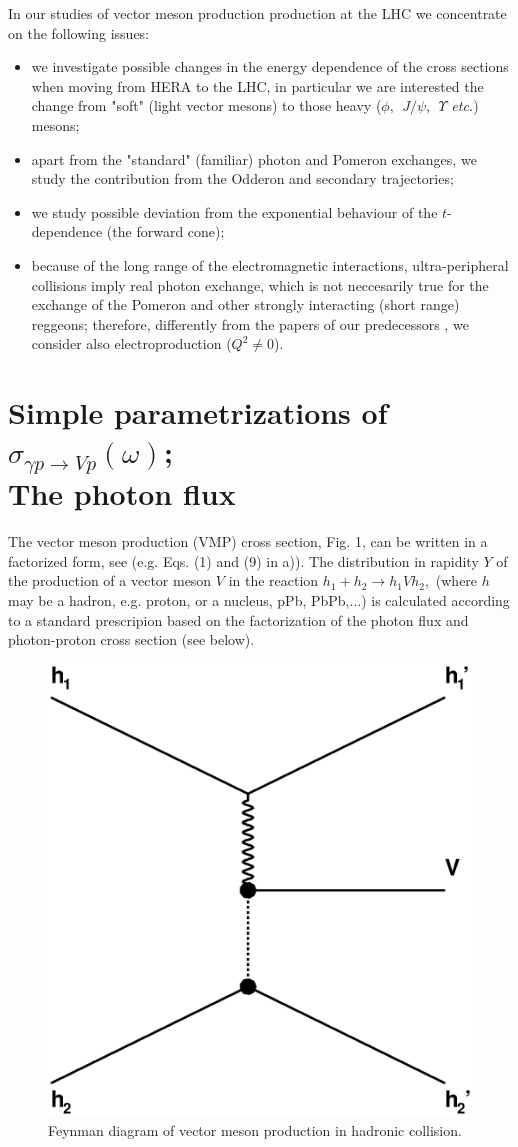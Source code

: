 \documentclass[12pt]{article}
\begin{document}
In our studies of vector meson production production at the LHC we concentrate on the following issues:
\begin{itemize}

\item we investigate possible changes in the energy dependence of the cross sections when moving from HERA to the LHC, in particular we are interested the change from "soft" (light vector mesons) to those heavy ($\phi,\ \ J/\psi,\ \ \Upsilon$ {\it etc.}) mesons;

\item apart from the "standard" (familiar) photon and Pomeron exchanges, we study the
contribution from the Odderon and secondary trajectories;

\item we study possible deviation from the exponential behaviour of the $t$-dependence
(the forward cone);

\item because of the long range of the electromagnetic interactions, ultra-peripheral collisions imply real photon exchange, which is not neccesarily true for the exchange of the Pomeron and other strongly interacting (short range) reggeons;  therefore, differently from the papers of our predecessors \cite{Schafer, Brazil, Ryskin, Motyka, Szczurek}, we consider also electroproduction ($Q^2\neq 0$).

\end{itemize}

\section{Simple parametrizations of $\sigma_{\gamma p\rightarrow Vp}(\omega)$;\\
The photon flux}\label{simple}

The vector meson production (VMP) cross section, Fig. 1, can be written in a factorized form, see \cite{Brazil, Review} (e.g. Eqs. (1) and (9) in \cite{Brazil}a)).
The distribution in rapidity $Y$ of the production of a vector meson $V$ in the reaction $h_1+h_2\rightarrow h_1Vh_2,$ (where $h$ may be a hadron, e.g. proton, or a nucleus, pPb, PbPb,...) is calculated according to a standard prescripion based on the factorization of the photon flux and photon-proton cross section (see below).

\begin{figure}[!h]
\centering
 \includegraphics[width=.4\textwidth]{figures/exclusive_vmp.eps}
 \caption{Feynman diagram of vector meson production in hadronic collision.}
 \label{fig:vmp_feynman}
\end{figure}
\end{document}
